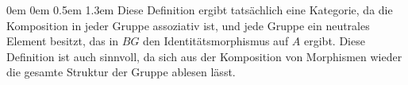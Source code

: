 \documentclass[a4paper,ngerman]{scrartcl}
\theoremstyle{definition}
\theoremstyle{plain}
\theoremstyle{remark}
\begin{document}
\begin{list}{}{0em \leftmargin0em \itemindent0.5em \itemsep 1.3em}
  Diese Definition ergibt tatsächlich eine Kategorie, da die Komposition in jeder Gruppe assoziativ ist, und jede Gruppe ein neutrales Element besitzt, das in $BG$ den Identitätsmorphismus auf $A$ ergibt.
  Diese Definition ist auch sinnvoll, da sich aus der Komposition von Morphismen wieder die gesamte Struktur der Gruppe ablesen lässt.
\end{list}
\end{document}
